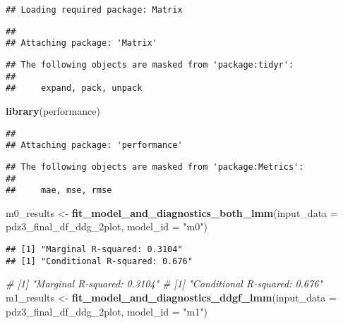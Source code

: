 \documentclass[
]{article}
\newenvironment{Shaded}{\begin{snugshade}}{\end{snugshade}}
\newcommand{\AttributeTok}[1]{\textcolor[rgb]{0.13,0.29,0.53}{#1}}
\newcommand{\CommentTok}[1]{\textcolor[rgb]{0.56,0.35,0.01}{\textit{#1}}}
\newcommand{\FunctionTok}[1]{\textcolor[rgb]{0.13,0.29,0.53}{\textbf{#1}}}
\newcommand{\NormalTok}[1]{#1}
\newcommand{\OtherTok}[1]{\textcolor[rgb]{0.56,0.35,0.01}{#1}}
\newcommand{\StringTok}[1]{\textcolor[rgb]{0.31,0.60,0.02}{#1}}
\begin{document}
\begin{verbatim}
## Loading required package: Matrix
\end{verbatim}

\begin{verbatim}
## 
## Attaching package: 'Matrix'
\end{verbatim}

\begin{verbatim}
## The following objects are masked from 'package:tidyr':
## 
##     expand, pack, unpack
\end{verbatim}

\begin{Shaded}
\begin{Highlighting}[]
\FunctionTok{library}\NormalTok{(performance)}
\end{Highlighting}
\end{Shaded}

\begin{verbatim}
## 
## Attaching package: 'performance'
\end{verbatim}

\begin{verbatim}
## The following objects are masked from 'package:Metrics':
## 
##     mae, mse, rmse
\end{verbatim}

\begin{Shaded}
\begin{Highlighting}[]
\NormalTok{m0\_results }\OtherTok{\textless{}{-}} \FunctionTok{fit\_model\_and\_diagnostics\_both\_lmm}\NormalTok{(}\AttributeTok{input\_data =}\NormalTok{ pdz3\_final\_df\_ddg\_2plot, }\AttributeTok{model\_id =} \StringTok{"m0"}\NormalTok{)}
\end{Highlighting}
\end{Shaded}

\begin{verbatim}
## [1] "Marginal R-squared: 0.3104"
## [1] "Conditional R-squared: 0.676"
\end{verbatim}

\begin{Shaded}
\begin{Highlighting}[]
\CommentTok{\# [1] "Marginal R{-}squared: 0.3104"}
\CommentTok{\# [1] "Conditional R{-}squared: 0.676"}
\NormalTok{m1\_results }\OtherTok{\textless{}{-}} \FunctionTok{fit\_model\_and\_diagnostics\_ddgf\_lmm}\NormalTok{(}\AttributeTok{input\_data =}\NormalTok{ pdz3\_final\_df\_ddg\_2plot, }\AttributeTok{model\_id =} \StringTok{"m1"}\NormalTok{)}
\end{Highlighting}
\end{Shaded}
\end{document}
